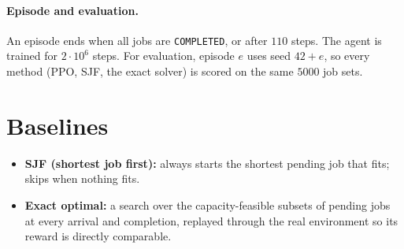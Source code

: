 \documentclass[11pt]{article}
\newcommand{\code}[1]{\texttt{#1}}
\begin{document}
\paragraph{Episode and evaluation.} An episode ends when all jobs are \code{COMPLETED}, or after $110$ steps. The agent is trained for $2\cdot 10^{6}$ steps. For evaluation, episode $e$ uses seed $42+e$, so every method (PPO, SJF, the exact solver) is scored on the same $5000$ job sets.

\section{Baselines}

\begin{itemize}[noitemsep]
  \item \textbf{SJF (shortest job first):} always starts the shortest pending job that fits; skips when nothing fits.
  \item \textbf{Exact optimal:} a search over the capacity-feasible subsets of pending jobs at every arrival and completion, replayed through the real environment so its reward is directly comparable.
\end{itemize}
\end{document}
